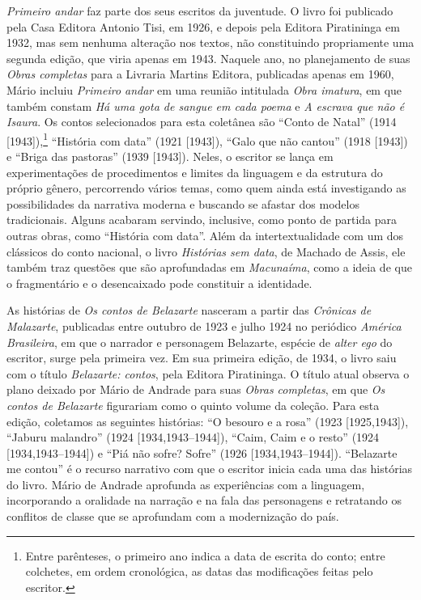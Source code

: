 \emph{Primeiro andar} faz parte dos seus escritos da juventude. O livro
foi publicado pela Casa Editora Antonio Tisi, em 1926, e depois pela
Editora Piratininga em 1932, mas sem nenhuma alteração nos textos, não
constituindo propriamente uma segunda edição, que viria apenas em 1943.
Naquele ano, no planejamento de suas \emph{Obras completas} para a
Livraria Martins Editora, publicadas apenas em 1960, Mário incluiu
\emph{Primeiro andar} em uma reunião intitulada \emph{Obra imatura}, em
que também constam \emph{Há uma gota de sangue em cada poema} e \emph{A
escrava que não é Isaura}. Os contos selecionados para esta coletânea
são ``Conto de Natal'' (1914 {[}1943{]}),\footnote{Entre parênteses, o
  primeiro ano indica a data de escrita do conto; entre colchetes, em
  ordem cronológica, as datas das modificações feitas pelo escritor.}
``História com data'' (1921 {[}1943{]}), ``Galo que não cantou'' (1918
{[}1943{]}) e ``Briga das pastoras'' (1939 {[}1943{]}). Neles, o
escritor se lança em experimentações de procedimentos e limites da
linguagem e da estrutura do próprio gênero, percorrendo vários temas,
como quem ainda está investigando as possibilidades da narrativa moderna
e buscando se afastar dos modelos tradicionais.
Alguns acabaram servindo, inclusive, como ponto de partida
para outras obras, como ``História com data''. Além da intertextualidade
com um dos clássicos do conto nacional, o livro \emph{Histórias sem
data}, de Machado de Assis, ele também traz questões que são
aprofundadas em \emph{Macunaíma}, como a ideia de que o fragmentário e o
desencaixado pode constituir a identidade.

As histórias de \emph{Os contos de Belazarte} nasceram a partir das
\emph{Crônicas de Malazarte}, publicadas entre outubro de 1923 e julho
1924 no periódico \emph{América Brasileira}, em que o narrador e
personagem Belazarte, espécie de \emph{alter ego} do escritor, surge
pela primeira vez. Em sua primeira edição, de 1934, o livro saiu com o
título \emph{Belazarte: contos}, pela Editora Piratininga. O título
atual observa o plano deixado por Mário de Andrade para suas \emph{Obras
completas}, em que \emph{Os contos de Belazarte} figurariam como o
quinto volume da coleção. Para esta edição, coletamos as seguintes
histórias: ``O besouro e a rosa'' (1923 {[}1925,1943{]}), ``Jaburu
malandro'' (1924 {[}1934,1943--1944{]}), ``Caim, Caim e o resto'' (1924
{[}1934,1943--1944{]}) e ``Piá não sofre? Sofre'' (1926
{[}1934,1943--1944{]}). ``Belazarte me contou'' é o recurso narrativo com
que o escritor inicia cada uma das histórias do livro. Mário de Andrade
aprofunda as experiências com a linguagem, incorporando a oralidade na
narração e na fala das personagens e retratando os conflitos de classe que se
aprofundam com a modernização do país.

